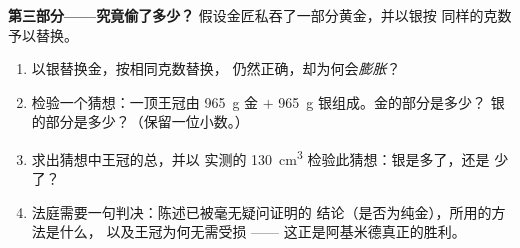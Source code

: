 \begin{problem}
\medskip\noindent\textbf{第三部分——究竟偷了多少？}
假设金匠私吞了一部分黄金，并以银按
同样的克数予以替换。
\begin{enumerate}[resume]
  \item 以银替换金，按相同克数替换，
        仍然正确，却为何会\emph{膨胀}？
  \item 检验一个猜想：一顶王冠由 \qty{965}{g} 金 $+$
        \qty{965}{g} 银组成。金的部分是多少？
        银的部分是多少？（保留一位小数。）
  \item 求出猜想中王冠的总，并以
        实测的 \qty{130}{cm^3} 检验此猜想：银是多了，还是
        少了？
  \item 法庭需要一句判决：陈述已被毫无疑问证明的
        结论（是否为纯金），所用的方法是什么，
        以及王冠为何无需受损 ——
        这正是阿基米德真正的胜利。
\end{enumerate}
\end{problem}
